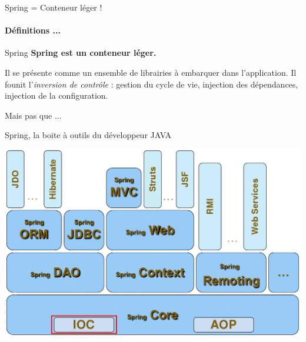 \documentclass[compress]{beamer}%
\begin{document}
\begin{frame}{Spring = Conteneur léger !}
	\framesubtitle{Définitions ...}

% 
	\begin{block}{Spring}
		\textbf{Spring est un conteneur léger.}\par
		Il se présente comme un ensemble de librairies à embarquer dans l'application. Il founit l'\emph{inversion de contrôle} : gestion du cycle de vie, injection des dépendances, injection de la configuration.
	\end{block}

	\pause
	\begin{center}
		\large
		Mais pas que ...
	\end{center}
\end{frame}

\begin{frame}{Spring, la boite à outils du développeur JAVA}

	\includegraphics[width=\textwidth]{images/spring_cartography.png}

\end{frame}
\end{document}
